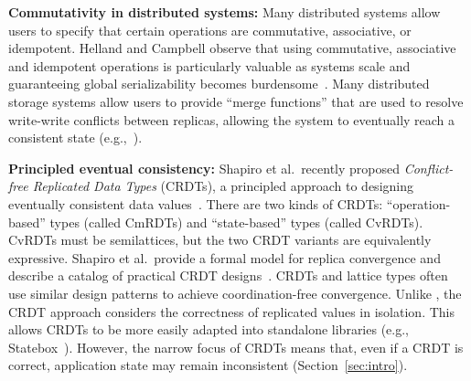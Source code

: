 \vspace{0.5em}\noindent
\textbf{Commutativity in distributed systems:} Many distributed systems allow
users to specify that certain operations are commutative, associative, or
idempotent. Helland and Campbell observe that using commutative, associative and
idempotent operations is particularly valuable as systems scale and guaranteeing
global serializability becomes burdensome~\cite{Helland2009}. Many
distributed storage systems allow users to provide ``merge functions'' that are
used to resolve write-write conflicts between replicas, allowing the system to
eventually reach a consistent state
(e.g.,~\cite{DeCandia2007,statebox,Lloyd2011,Reiher1994,Terry1995}).%



\vspace{0.5em}\noindent
\textbf{Principled eventual consistency:} Shapiro et al.\ recently proposed
\emph{Conflict-free Replicated Data Types} (CRDTs), a principled approach to
designing eventually consistent data values~\cite{Shapiro2011b}. There are two
kinds of CRDTs: ``operation-based'' types (called CmRDTs) and ``state-based''
types (called CvRDTs). CvRDTs must be semilattices, but the two CRDT variants
are equivalently expressive. Shapiro et al.\ provide a formal model for replica
convergence and describe a catalog of practical CRDT
designs~\cite{Shapiro2011a}. CRDTs and \lang lattice types often use similar
design patterns to achieve coordination-free convergence. Unlike \lang, the CRDT
approach considers the correctness of replicated values in isolation. This
allows CRDTs to be more easily adapted into standalone libraries (e.g.,
Statebox~\cite{statebox}). However, the narrow focus of CRDTs means that, even
if a CRDT is correct, application state may remain inconsistent
(Section~\ref{sec:intro}).

